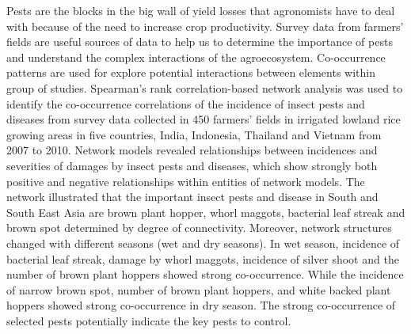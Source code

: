 \documentclass[12pt,a4paper]{article}
\begin{document}
Pests are the blocks in the big wall of yield losses that agronomists have to deal with because of the need to increase crop productivity. Survey data from farmers' fields are useful sources of data to help us to determine the importance of pests and understand the complex interactions of the agroecosystem. Co-occurrence patterns are used for explore potential interactions between elements within group of studies. Spearman's rank correlation-based network analysis was used to identify the co-occurrence correlations of the incidence of insect pests and diseases from survey data collected in 450 farmers' fields in irrigated lowland rice growing areas in five countries, India, Indonesia, Thailand and Vietnam from 2007 to 2010. Network models revealed relationships between incidences and severities of damages by insect pests and diseases, which show strongly both positive and negative relationships within entities of network models. The network illustrated that the important insect pests and disease in South and South East Asia are brown plant hopper, whorl maggots, bacterial leaf streak and brown spot determined by degree of connectivity. Moreover, network structures changed with different seasons (wet and dry seasons). In wet season, incidence of bacterial leaf streak, damage by whorl maggots, incidence of silver shoot and the number of brown plant hoppers showed strong co-occurrence. While the incidence of narrow brown spot, number of brown plant hoppers, and white backed plant hoppers showed strong co-occurrence in dry season. The strong co-occurrence of selected pests potentially indicate the key pests to control. 
 
\end{document}
